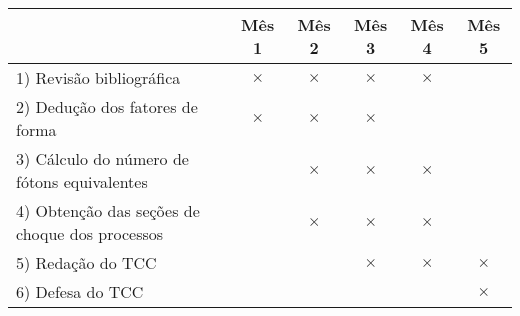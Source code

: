 \begin{tabular}{lccccc}
	\toprule
	& Mês 1 & Mês 2 & Mês 3 & Mês 4 & Mês 5\\
	\midrule \midrule
	1) Revisão bibliográfica & $\times$ & $\times$ & $\times$ & $\times$ &
	\\
	2) Dedução dos fatores de forma & $\times$
		 & $\times$ & $\times$ & & \\
	3) Cálculo do número de fótons equivalentes & & $\times$ & $\times$ &
		$\times$ & \\
	4) Obtenção das seções de choque dos processos & & $\times$ & $\times$
		& $\times$ & \\
	5) Redação do TCC & & & $\times$ & $\times$ & $\times$ \\
	6) Defesa do TCC & & & & & $\times$ \\
	\bottomrule
\end{tabular}
